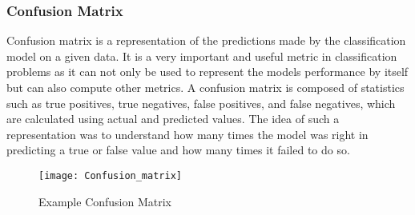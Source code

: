 \documentclass[11pt,openright]{report}
\begin{document}
\subsubsection {Confusion Matrix}
Confusion matrix is a representation of the predictions made by the classification model on a given data. It is a very important and useful metric in classification problems as it can not only be used to represent the models performance by itself but can also compute other metrics. A confusion matrix is composed of statistics such as true positives, true negatives, false positives, and false negatives, which are calculated using actual and predicted values. The idea of such a representation was to understand how many times the model was right in predicting a true or false value and how many times it failed to do so.

  \begin{figure}[!htbp]
	\centering
	\texttt{[image: Confusion\_matrix]}
	\caption{Example Confusion Matrix}
	\label{fig:example_confusion_matrix}
\end{figure} 
\end{document}

